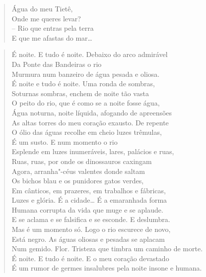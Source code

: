 

\begin{verse}
\qquad\qquad\qquad\qquad\qquad Água do meu Tietê,\\
\qquad\qquad\qquad\qquad\qquad Onde me queres levar?\\
\qquad\qquad\qquad\qquad\qquad -- Rio que entras pela terra\\
\qquad\qquad\qquad\qquad\qquad E que me afastas do mar\ldots{}
\end{verse}

\begin{verse}
É noite. E tudo é noite. Debaixo do arco admirável\\
Da Ponte das Bandeiras o rio\\
Murmura num banzeiro de água pesada e oliosa.\\
É noite e tudo é noite. Uma ronda de sombras,\\
Soturnas sombras, enchem de noite tão vasta\\
O peito do rio, que é como se a noite fosse água,\\
Água noturna, noite líquida, afogando de apreensões\\
As altas torres do meu coração exausto. De repente\\
O ólio das águas recolhe em cheio luzes trêmulas,\\
É um susto. E num momento o rio\\
Esplende em luzes inumeráveis, lares, palácios e ruas,\\
Ruas, ruas, por onde os dinossauros caxingam\\
Agora, arranha"-céus valentes donde saltam\\
Os bichos blau e os punidores gatos verdes,\\
Em cânticos, em prazeres, em trabalhos e fábricas,\\
Luzes e glória. É a cidade\ldots{} É a emaranhada forma\\
Humana corrupta da vida que muge e se aplaude.\\
E se aclama e se falsifica e se esconde. E deslumbra.\\
Mas é um momento só. Logo o rio escurece de novo,\\
Está negro. As águas oliosas e pesadas se aplacam\\
Num gemido. Flor. Tristeza que timbra um caminho de morte.\\
É noite. E tudo é noite. E o meu coração devastado\\
É um rumor de germes insalubres pela noite insone e humana.


\end{verse}
